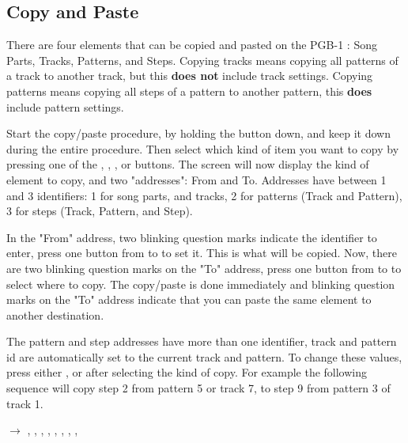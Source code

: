 \documentclass[8pt]{extarticle}
\def\device{PGB-1 }
\newcommand{\OLEDscreenshot}[1]{
\begin{tcolorbox}[hbox, colframe=black, colback=white, boxsep=-3pt]%
\texttt{[image: \#1]}
\end{tcolorbox}
}
\begin{document}
\begin{multicols*}{3}
\section{Copy and Paste}

There are four elements that can be copied and pasted on the \device: Song Parts, Tracks, Patterns, and Steps.
Copying tracks means copying all patterns of a track to another track, but this \textbf{does not} include track settings.
Copying patterns means copying all steps of a pattern to another pattern, this \textbf{does} include pattern settings.

Start the copy/paste procedure, by holding the  button down, and keep it down during the entire procedure.
Then select which kind of item you want to copy by pressing one of the , , , or  buttons.
The screen will now display the kind of element to copy, and two "addresses": From and To. Addresses have between 1 and 3 identifiers: 1 for song parts, and tracks, 2 for patterns (Track and Pattern), 3 for steps (Track, Pattern, and Step).

\begin{center}
    \scalebox{0.5}{\OLEDscreenshot{../assets/OLED-screenshots/PGB1-OLED-copy-track.png}}
    \scalebox{0.5}{\OLEDscreenshot{../assets/OLED-screenshots/PGB1-OLED-copy-pattern.png}}
    \scalebox{0.5}{\OLEDscreenshot{../assets/OLED-screenshots/PGB1-OLED-copy-step.png}}
\end{center}


In the "From" address, two blinking question marks indicate the identifier to enter, press one button from  to  to set it. This is what will be copied.
Now, there are two blinking question marks on the "To" address, press one button from  to  to select where to copy. The copy/paste is done immediately and blinking question marks on the "To" address indicate that you can paste the same element to another destination.


The pattern and step addresses have more than one identifier, track and pattern id are automatically set to the current track and pattern.
To change these values, press either , or  after selecting the kind of copy.
For example the following sequence will copy step 2 from pattern 5 or track 7, to step 9 from pattern 3 of track 1.

 $\rightarrow$ , , , , , , , , 


\end{multicols*}
\end{document}
